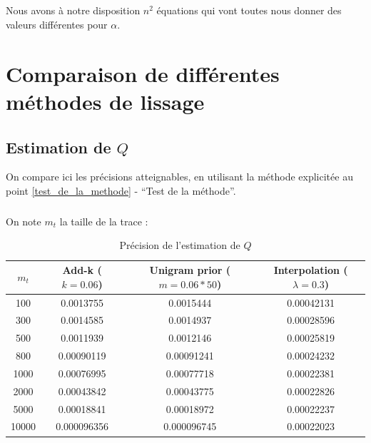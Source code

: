 \documentclass[a4paper,titlepage]{report}
\begin{document}
\paragraph{}
Nous avons à notre disposition $n^2$ équations qui vont toutes nous donner des valeurs différentes pour $\alpha$. 

\appendix

\chapter{Comparaison de différentes méthodes de lissage}

\section{Estimation de $Q$}
On compare ici les précisions atteignables, en utilisant la méthode explicitée au point \ref{test_de_la_methode} - ``Test de la méthode''.
\paragraph{}
On note $m_t$ la taille de la trace :
\begin{table}[h]
	\center
	\begin{tabular}{c|ccc}
	$m_t$ & Add-k ($k = 0.06$) & Unigram prior ($m = 0.06 * 50$) & Interpolation ($\lambda = 0.3$)\\
	\hline
	100 & \num{0.0013755} & \num{0.0015444} & \num{0.00042131}\\
	300 & \num{0.0014585} & \num{0.0014937} & \num{0.00028596}\\
	500 & \num{0.0011939} & \num{0.0012146} & \num{0.00025819}\\
	800 & \num{0.00090119} & \num{0.00091241} & \num{0.00024232}\\
	1000 & \num{0.00076995} & \num{0.00077718} & \num{0.00022381}\\
	2000 & \num{0.00043842} & \num{0.00043775} & \num{0.00022826}\\
	5000 & \num{0.00018841} & \num{0.00018972} & \num{0.00022237}\\	
	10000 & \num{0.000096356} & \num{0.000096745} & \num{0.00022023}\\	
	\end{tabular}
	\caption{Précision de l'estimation de $Q$}
	\label{tab:}
\end{table}

\paragraph{}
\end{document}
